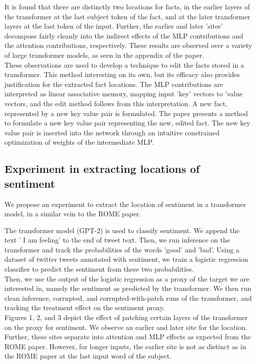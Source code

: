 \documentclass[10pt,a4paper]{report}
\begin{document}
It is found that there are distinctly two locations for facts, in the earlier layers of the transformer at the last subject token of the fact, and at the later transformer layers  at the last token of the input. 
Further, the earlier and later 'sites' decompose fairly cleanly into the indirect effects of the MLP contributions and the attention contributions, respectively.
These results are observed over a variety of large transformer models, as seen in the appendix of the paper.
\\
These observations are used to develop a technique to edit the facts stored in a transformer.
This method interesting on its own, but its efficacy also provides justification for the extracted fact locations. 
The MLP contributions are interpreted as linear associative memory, mapping input 'key' vectors to 'value vectors, and the edit method follows from this interpretation.
A new fact, represented by a new key value pair is formulated. The paper presents a method to formulate a new key value pair representing the new, edited fact.
The new key value pair is inserted into the network through an intuitive constrained optimization of weights of the intermediate MLP.
\\


\subsection{Experiment in extracting locations of sentiment}

We propose an experiment to extract the location of sentiment in a transformer model, in a similar vein to the ROME paper. 

The transformer model (GPT-2) is used to classify sentiment. We append the text ' I am feeling' to the end of tweet text. Then, we run inference on the transformer and track the probabilities of the words 'good' and 'bad'.
Using a dataset of twitter tweets annotated with sentiment, we train a logistic regression classifier to predict the sentiment from these two probabilities. 
\\
Then, we use the output of the logistic regression as a proxy of the target we are interested in, namely the sentiment as predicted by the transformer. We then run clean inference, corrupted, and corrupted-with-patch runs of the transformer, and tracking the treatment effect on the sentiment proxy.
\\
Figures 1, 2, and 3 depict the effect of patching certain layers of the transformer on the proxy for sentiment. We observe an earlier and later site for the location. Further, these sites separate into attention and MLP effects as expected from the ROME paper. However, for longer inputs, the earlier site is not as distinct as in the ROME paper at the last input word of the subject.  
\end{document}
